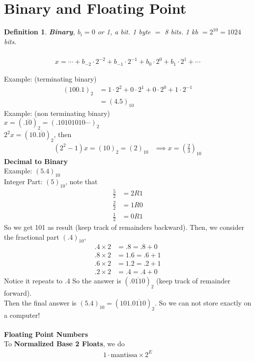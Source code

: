 \documentclass[11pt,oneside]{book}
\theoremstyle{break}
\theoremstyle{break}
\newtheorem{defn}{Definition}[corL]
\newcommand{\example}{\color{purple}Example: \color{black}}
\begin{document}
\section[Binary and Floating Point]{Binary and Floating Point}
\begin{defn}
\textbf{Binary}, $b_i=0$ or 1, a bit. 1 byte $=$ 8 bits. 1 kb $=2^10=1024$ bits.\\
\hfill\\
\begin{align*}
x=\cdots+b_{-2}\cdot 2^{-2}+b_{-1}\cdot 2^{-1}+b_0\cdot
 2^0  +b_1\cdot 2^{1}+\cdots
 \end{align*}
\end{defn}
\example (terminating binary)
\begin{align*}
(100.1)_2&=1\cdot 2^2+0\cdot 2^1 +0\cdot 2^0+1\cdot 2^{-1}\\
&=(4.5)_{10}
\end{align*}
\example (non terminating binary)\\
$x=(.\overline{10})_2=(.10101010\cdots)_2$\\
$2^2x=(10.\overline{10})_2$, then \begin{align*}
(2^2-1)x=(10)_2=(2)_{10}&\implies x=\left(\frac{2}{3} \right)_{10}
\end{align*} 
\textbf{Decimal to Binary}\\
\example $(5.4)_{10}$\\
Integer Part: $(5)_{10}$, note that \begin{align*}
\frac{5}{2}&=2R1\\
\frac{2}{2}&=1R0\\
\frac{1}{2}&=0R1
\end{align*}
So we get 101 as result (keep track of remainders backward). Then, we consider the fractional part $(.4)_{10}$, \begin{align*}
.4\times 2&=.8=.8+0\\
.8\times 2&=1.6=.6+1\\
.6\times 2&=1.2=.2+1\\
.2\times 2&=.4=.4+0
\end{align*}
Notice it repeats to .4 So the answer is $(.\overline{0110})_2$ (keep track of remainder forward).\\
Then the final answer is $(5.4)_{10}=(101.\overline{0110})_2$. So we can not store exactly on a computer!\\
\hfill\\
\textbf{Floating Point Numbers}\\
To \textbf{Normalized Base 2 Floats}, we do \begin{align*}
[\pm]1\cdot \text{mantissa}\times
 2^{E}
\end{align*}
\end{document}

